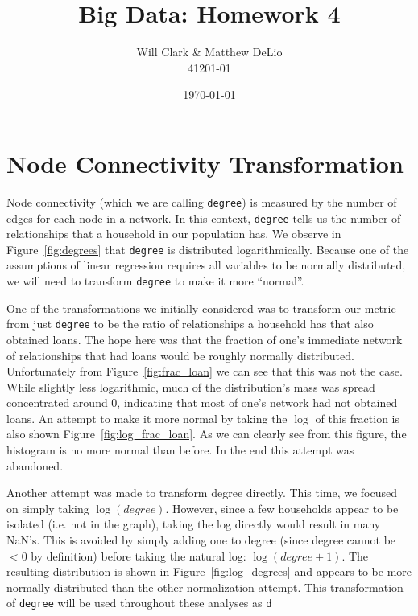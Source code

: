\documentclass[11pt, fleqn]{article}
\begin{document}
\title{Big Data: Homework 4}
\author{Will Clark \& Matthew DeLio \\ 41201-01}
\date{\today}
\maketitle

\section{Node Connectivity Transformation}

Node connectivity (which we are calling \texttt{degree}) is measured by the number of edges for each node in a network. In this context, \texttt{degree} tells us the number of relationships that a household in our population has. We observe in Figure~\ref{fig:degrees} that \texttt{degree} is distributed logarithmically.  Because one of the assumptions of linear regression requires all variables to be normally distributed, we will need to transform \texttt{degree} to make it more ``normal''.

One of the transformations we initially considered was to transform our metric from just \texttt{degree} to be the ratio of relationships a household has that also obtained loans.  The hope here was that the fraction of one's immediate network of relationships that had loans would be roughly normally distributed.  Unfortunately from Figure~\ref{fig:frac_loan} we can see that this was not the case.  While slightly less logarithmic, much of the distribution's mass was spread concentrated around 0, indicating that most of one's network had not obtained loans.  An attempt to make it more normal by taking the $\log$ of this fraction is also shown Figure~\ref{fig:log_frac_loan}.  As we can clearly see from this figure, the histogram is no more normal than before.  In the end this attempt was abandoned.

Another attempt was made to transform degree directly.  This time, we focused on simply taking $\log(degree)$.  However, since a few households appear to be isolated (i.e. not in the graph), taking the log directly would result in many NaN's.  This is avoided by simply adding one to degree (since degree cannot be $<0$ by definition) before taking the natural log: $\log(degree+1)$.  The resulting distribution is shown in Figure~\ref{fig:log_degrees} and appears to be more normally distributed than the other normalization attempt.  This transformation of \texttt{degree} will be used throughout these analyses as \texttt{d}
\end{document}

